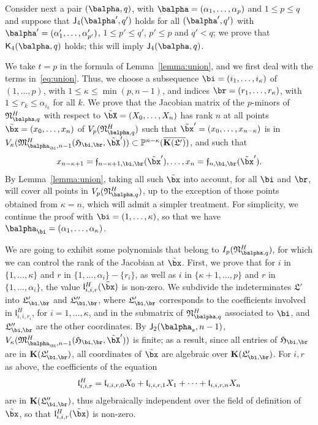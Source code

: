 \documentclass[12pt]{article}
\begin{document}
Consider next a pair $(\balpha,q)$, with
$\balpha=(\alpha_1,\dots,\alpha_p)$ and $1 \le p \le q$ and suppose
that $\assI_4(\balpha',q')$ holds for all $(\balpha',q')$ with
$\balpha'=(\alpha'_1,\dots,\alpha'_{p'})$, $1 \le p' \le q'$, $p' \le
p$ and $q' < q$; we prove that $\assJ_4(\balpha,q)$ holds; this will
imply $\assI_4(\balpha,q)$.

We take $t=p$ in the formula of Lemma~\ref{lemma:union}, and we first
deal with the terms in~\eqref{eq:union}.  Thus, we choose a
subsequence $\bi=(i_1,\dots,i_\kappa)$ of $(1,\dots,p)$, with $1 \le \kappa\le
\min(p,n-1)$, and indices $\br=(r_1,\dots,r_\kappa)$, with $ 1\le r_k \le
\alpha_{i_k}$ for all $k$. We prove that the Jacobian matrix of the $p$-minors of $\mathfrak{N}^H_{\balpha,q}$
with respect to $\tilde\bX=(X_0,\dots,X_n)$ has rank $n$ at all points $\tilde\bx=(x_0,\dots,x_n)$ of
$V_p(\mathfrak{N}^H_{\balpha,q})$  such that
$\tilde\bx'=(x_0,\dots,x_{n-\kappa})$ is in
$V_\kappa(\mathfrak{M}^H_{\balpha_\bi,n-1}(\mathfrak{H}_{\bi,\br},\tilde\bX')) \subset
\P^{n-\kappa}(\KKGpbar)$, and such that
\begin{align}\label{eq:subsX}
  x_{n-\kappa+1}=\mathfrak{f}_{n-\kappa+1,\bi,\br}(\tilde\bx'),\dots,x_{n}=\mathfrak{f}_{n,\bi,\br}(\tilde\bx').
\end{align}
By Lemma~\ref{lemma:union}, taking all such $\tilde\bx$ into account,
for all $\bi$ and $\br$, will cover all points in
$V_p(\mathfrak{N}^H_{\balpha,q})$, up to the exception of those points
obtained from $\kappa=n$, which will admit a simpler treatment.
For simplicity, we continue the proof with $\bi=(1,\dots,\kappa)$, so
that we have $\balpha_\bi=(\alpha_1,\dots,\alpha_\kappa)$.  

We are going to exhibit some polynomials that belong to
$I_p(\mathfrak{N}^H_{\balpha,q})$, for which we can control the rank
of the Jacobian at $\tilde\bx$. First, we prove that for $i$ in
$\{1,\dots,\kappa\}$ and $r$ in $\{1,\dots,\alpha_i\}-\{r_i\}$, as
well as $i$ in $\{\kappa+1,\dots,p\}$ and $r$ in
$\{1,\dots,\alpha_i\}$, the value $\mathfrak{l}^H_{i,i,r}(\tilde\bx)$
is non-zero.  We subdivide the indeterminates $\mathfrak{L}'$ into
$\mathfrak{L}'_{\bi,\br}$ and $\mathfrak{L}''_{\bi,\br}$, where
$\mathfrak{L}'_{\bi,\br}$ corresponds to the coefficients involved in
$\mathfrak{l}^H_{i,i,r_i}$, for $i=1,\dots,\kappa$, and in the
submatrix of $\mathfrak{N}^H_{\balpha,q}$ associated to $\bi$, and
$\mathfrak{L}''_{\bi,\br}$ are the other coordinates.  By
$\assI_2(\balpha_s,n-1)$,
$V_\kappa(\mathfrak{M}^H_{\balpha_\bi,n-1}(\mathfrak{H}_{\bi,\br},\tilde\bX'))$
is finite; as a result, since all entries of $\mathfrak{H}_{\bi,\br}$ 
are in $\KK(\mathfrak{L}'_{\bi,\br})$,
all coordinates of $\tilde\bx$ are algebraic
over $\KK(\mathfrak{L}'_{\bi,\br})$. For $i,r$ as above, the
coefficients of the equation
$$\mathfrak{l}^H_{i,i,r} = \frak{l}_{i,i,r,0} X_0+ \frak{l}_{i,i,r,1}
X_1 +\cdots + \frak{l}_{i,i,r,n} X_n$$ are
in  $\KK(\mathfrak{L}''_{\bi,\br})$, thus algebraically independent
over the field of definition of $\tilde\bx$, so that $\mathfrak{l}^H_{i,i,r}(\tilde\bx)$
is non-zero.
\end{document}
